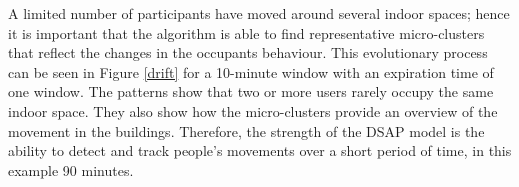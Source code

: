 

A limited number of participants have moved around several indoor spaces; hence it is important that the algorithm is able to find representative micro-clusters that reflect the changes in the occupants behaviour. This evolutionary process can be seen in Figure \ref{drift} for a 10-minute window with an expiration time of one window. The patterns show that two or more users rarely occupy the same indoor space. They also show how the micro-clusters provide an overview of the movement in the buildings. Therefore, the strength of the DSAP model is the ability to detect and track people's movements over a short period of time, in this example 90 minutes.



